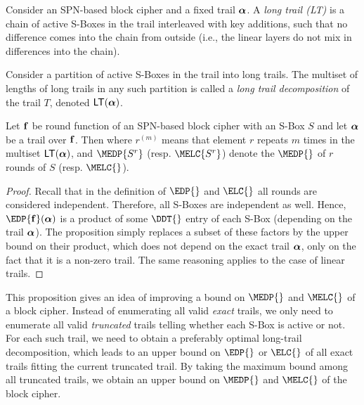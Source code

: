 \newcommand\LT[1]{\mathsf{LT}({#1})}
\begin{definition}
Consider an SPN-based block cipher and a fixed trail $\boldsymbol{\alpha}$. A \emph{long trail (LT)} is a chain of active S-Boxes in the trail interleaved with key additions, such that no difference comes into the chain from outside (i.e., the linear layers do not mix in differences into the chain).

Consider a partition of active S-Boxes in the trail into long trails. The multiset of lengths of long trails in any such partition is called a \emph{long trail decomposition} of the trail $T$, denoted $\LT{\valpha}$.
\end{definition}

\begin{proposition}
Let $\mathbf{f}$ be round function of an SPN-based block cipher with an S-Box $S$ and let $\boldsymbol{\alpha}$ be a trail over $\mathbf{f}$. Then
\eq{
&\EDP{\vf}(\valpha) \le \prod_{r^{(m)} \in \LT{\valpha}} \pround{\MEDP{S^r}}^m,\\
&\ELC{\vf}(\valpha) \le \prod_{r^{(m)} \in \LT{\valpha}} \pround{\MELC{S^r}}^m,
}
where $r^{(m)}$ means that element $r$ repeats $m$ times in the multiset $\LT{\valpha}$, and $\MEDP{S^r}$ (resp. $\MELC{S^r}$) denote the $\MEDP{}$ of $r$ rounds of $S$ (resp. $\MELC{}$).
\end{proposition}

\begin{proof}
Recall that in the definition of $\EDP{}$ and $\ELC{}$ all rounds are considered independent. Therefore, all S-Boxes are independent as well. Hence, $\EDP{\vf}(\valpha)$ is a product of some $\DDT{}$ entry of each S-Box (depending on the trail $\boldsymbol{\alpha}$). The proposition simply replaces a subset of these factors by the upper bound on their product, which does not depend on the exact trail $\boldsymbol{\alpha}$, only on the fact that it is a non-zero trail. The same reasoning applies to the case of linear trails.
\end{proof}

This proposition gives an idea of improving a bound on $\MEDP{}$ and $\MELC{}$ of a block cipher. Instead of enumerating all valid \emph{exact} trails, we only need to enumerate all valid \emph{truncated} trails telling whether each S-Box is active or not. For each such trail, we need to obtain a preferably optimal long-trail decomposition, which leads to an upper bound on $\EDP{}$ or $\ELC{}$ of all exact trails fitting the current truncated trail. By taking the maximum bound among all truncated trails, we obtain an upper bound on $\MEDP{}$ and $\MELC{}$ of the block cipher.

